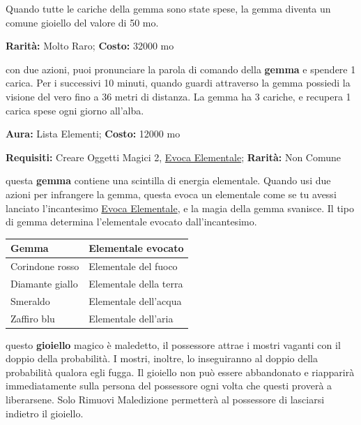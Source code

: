 \begin{multicols}{2}
\begin{itemize}[leftmargin=*]
\end{itemize}

\medskip

Quando tutte le cariche della gemma sono state spese, la gemma diventa un comune gioiello del valore di 50 mo.


\textbf{Rarità:} Molto Raro; \textbf{Costo:} 32000 mo

con due azioni, puoi pronunciare la parola di comando della \textbf{gemma} e spendere 1 carica. Per i successivi 10 minuti, quando guardi attraverso la gemma possiedi la visione del vero fino a 36 metri di distanza. La gemma ha 3 cariche, e recupera 1 carica spese ogni giorno all'alba.


\textbf{Aura:} Lista Elementi; \textbf{Costo:} 12000 mo

\textbf{Requisiti:} Creare Oggetti Magici 2, \hyperlink{Evoca Elementale}{Evoca Elementale}; \textbf{Rarità:} Non Comune

questa \textbf{gemma} contiene una scintilla di energia elementale. Quando usi due azioni per infrangere la gemma, questa evoca un elementale come se tu avessi lanciato l'incantesimo \hyperlink{Evoca Elementale}{Evoca Elementale}, e la magia della gemma svanisce. Il tipo di gemma determina l'elementale evocato dall'incantesimo.

\medskip

\noindent\begin{tabularx}{\linewidth}{ll}
	\toprule
\rowcolor{gray!20}\textbf{Gemma} &\textbf{Elementale evocato}\\
\toprule
Corindone rosso& Elementale del fuoco\\
\rowcolor{gray!20}Diamante giallo& Elementale della terra\\
Smeraldo &Elementale dell'acqua\\
\rowcolor{gray!20}Zaffiro blu&Elementale dell'aria
\end{tabularx}

\medskip


questo \textbf{gioiello} magico è maledetto, il possessore attrae i mostri vaganti con il doppio della probabilità. I mostri, inoltre, lo inseguiranno al doppio della probabilità qualora egli fugga. Il gioiello non può essere abbandonato e riapparirà immediatamente sulla persona del possessore ogni volta che questi proverà a liberarsene. Solo Rimuovi Maledizione permetterà al possessore di lasciarsi indietro il gioiello.


\end{multicols}
